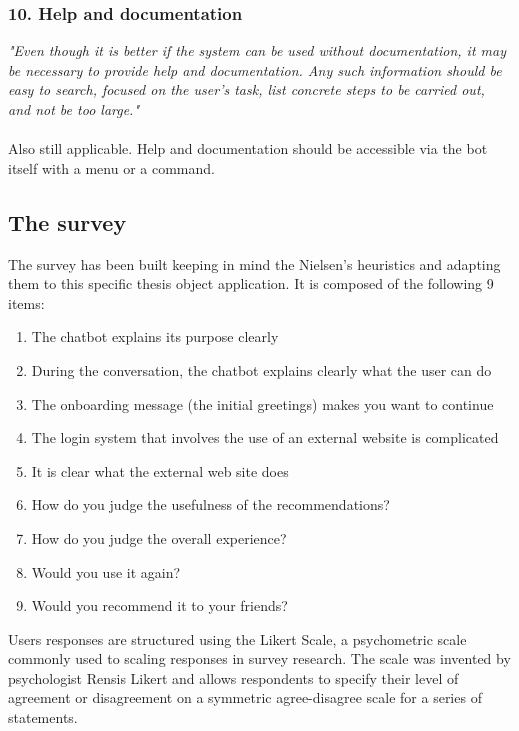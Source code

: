 \documentclass[b5paper,10pt,twoside,cucitura]{toptesi}
\begin{document}
\subsubsection{10. Help and documentation}
\textit{"Even though it is better if the system can be used without documentation, it may be necessary to provide help and documentation. Any such information should be easy to search, focused on the user’s task, list concrete steps to be carried out, and not be too large."}
\\
\\
Also still applicable. Help and documentation should be accessible via the bot itself with a menu or a command.

\newpage

\subsection{The survey}

The survey has been built keeping in mind the Nielsen's heuristics and adapting them to this specific thesis object application. It is composed of the following 9 items:

\begin{enumerate}
\item The chatbot explains its purpose clearly
\item During the conversation, the chatbot explains clearly what the user can do
\item The onboarding message (the initial greetings) makes you want to continue
\item The login system that involves the use of an external website is complicated
\item It is clear what the external web site does
\item How do you judge the usefulness of the recommendations?
\item How do you judge the overall experience?
\item Would you use it again?
\item Would you recommend it to your friends?
\end{enumerate}

Users responses are structured using the Likert Scale, a psychometric scale commonly used to scaling responses in survey research. The scale was invented by psychologist Rensis Likert and allows respondents to specify their level of agreement or disagreement on a symmetric agree-disagree scale for a series of statements.
\end{document}
